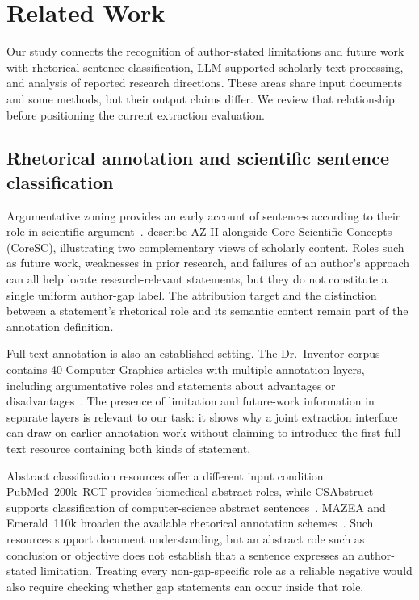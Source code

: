 \section{Related Work}
\label{S:related-works}

Our study connects the recognition of author-stated limitations and future work with rhetorical
sentence classification, LLM-supported scholarly-text processing, and analysis of reported research
directions. These areas share input documents and some methods, but their output claims differ.
We review that relationship before positioning the current extraction evaluation.

\subsection{Rhetorical annotation and scientific sentence classification}
\label{S:rw-background}

Argumentative zoning provides an early account of sentences according to their role in scientific
argument~\citep{teufel2002summarizing}. \citet{liakata2010corpora} describe AZ-II alongside Core
Scientific Concepts (CoreSC), illustrating two complementary views of scholarly content. Roles
such as future work, weaknesses in prior research, and failures of an author's approach can all
help locate research-relevant statements, but they do not constitute a single uniform author-gap
label. The attribution target and the distinction between a statement's rhetorical role and its
semantic content remain part of the annotation definition.

Full-text annotation is also an established setting. The Dr.~Inventor corpus contains 40 Computer
Graphics articles with multiple annotation layers, including argumentative roles and statements
about advantages or disadvantages~\citep{fisas2016multilayered}. The presence of limitation and
future-work information in separate layers is relevant to our task: it shows why a joint extraction
interface can draw on earlier annotation work without claiming to introduce the first full-text
resource containing both kinds of statement.

Abstract classification resources offer a different input condition. PubMed~200k~RCT
provides biomedical abstract roles, while CSAbstruct supports classification of computer-science
abstract sentences~\citep{dernoncourt2017pubmed,cohan2019pretrained}.
MAZEA and Emerald~110k broaden the available rhetorical annotation
schemes~\citep{dayrell2012rhetorical,stead2019emerald}. Such resources support document understanding,
but an abstract role such as conclusion or objective does not establish that a sentence expresses
an author-stated limitation. Treating every non-gap-specific role as a reliable negative would
also require checking whether gap statements can occur inside that role.

